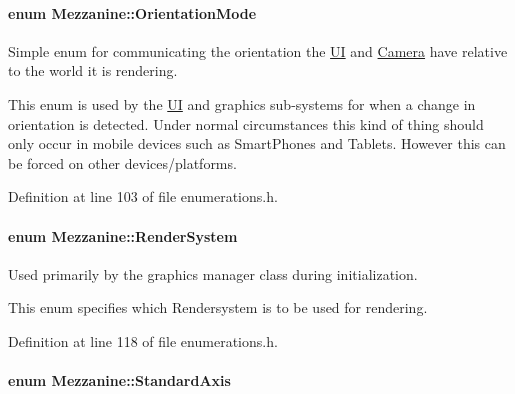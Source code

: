\hypertarget{namespaceMezzanine_a8892173bd6aaf7d0e34a07b2b30aad33}{
\paragraph[{OrientationMode}]{\setlength{\rightskip}{0pt plus 5cm}enum {\bf Mezzanine::OrientationMode}}\hfill}
\label{namespaceMezzanine_a8892173bd6aaf7d0e34a07b2b30aad33}


Simple enum for communicating the orientation the \hyperlink{namespaceMezzanine_1_1UI}{UI} and \hyperlink{classMezzanine_1_1Camera}{Camera} have relative to the world it is rendering. 

This enum is used by the \hyperlink{namespaceMezzanine_1_1UI}{UI} and graphics sub-\/systems for when a change in orientation is detected. Under normal circumstances this kind of thing should only occur in mobile devices such as SmartPhones and Tablets. However this can be forced on other devices/platforms. 

Definition at line 103 of file enumerations.h.

\hypertarget{namespaceMezzanine_a1bb0347c37954bc71c4344e4b55c729a}{
\paragraph[{RenderSystem}]{\setlength{\rightskip}{0pt plus 5cm}enum {\bf Mezzanine::RenderSystem}}\hfill}
\label{namespaceMezzanine_a1bb0347c37954bc71c4344e4b55c729a}


Used primarily by the graphics manager class during initialization. 

This enum specifies which Rendersystem is to be used for rendering. 

Definition at line 118 of file enumerations.h.

\hypertarget{namespaceMezzanine_ab41a00a8c6a47b576dc987ec34e16ba1}{
\paragraph[{StandardAxis}]{\setlength{\rightskip}{0pt plus 5cm}enum {\bf Mezzanine::StandardAxis}}\hfill}
\label{namespaceMezzanine_ab41a00a8c6a47b576dc987ec34e16ba1}



